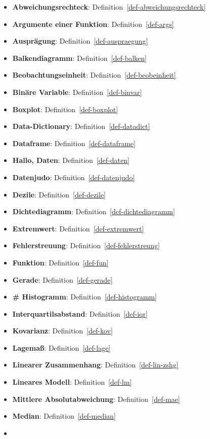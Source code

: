 \documentclass[
  a4paper,
]{scrbook}
\theoremstyle{definition}
\theoremstyle{definition}
\theoremstyle{definition}
\theoremstyle{remark}
\begin{document}
\begin{itemize}
\item
  \textbf{Abweichungsrechteck}: Definition~\ref{def-abweichungsrechteck}
\item
  \textbf{Argumente einer Funktion}: Definition~\ref{def-args}
\item
  \textbf{Ausprägung}: Definition~\ref{def-auspraegung}
\item
  \textbf{Balkendiagramm}: Definition~\ref{def-balken}
\item
  \textbf{Beobachtungseinheit}: Definition~\ref{def-beobeinheit}
\item
  \textbf{Binäre Variable}: Definition~\ref{def-binvar}
\item
  \textbf{Boxplot}: Definition~\ref{def-boxplot}
\item
  \textbf{Data-Dictionary}: Definition~\ref{def-datadict}
\item
  \textbf{Dataframe}: Definition~\ref{def-dataframe}
\item
  \textbf{Hallo, Daten}: Definition~\ref{def-daten}
\item
  \textbf{Datenjudo}: Definition~\ref{def-datenjudo}
\item
  \textbf{Dezile}: Definition~\ref{def-dezile}
\item
  \textbf{Dichtediagramm}: Definition~\ref{def-dichtediagramm}
\item
  \textbf{Extremwert}: Definition~\ref{def-extremwert}
\item
  \textbf{Fehlerstreuung}: Definition~\ref{def-fehlerstreung}
\item
  \textbf{Funktion}: Definition~\ref{def-fun}
\item
  \textbf{Gerade}: Definition~\ref{def-gerade}
\item
  \textbf{\# Histogramm}: Definition~\ref{def-histogramm}
\item
  \textbf{Interquartilsabstand}: Definition~\ref{def-iqr}
\item
  \textbf{Kovarianz}: Definition~\ref{def-kov}
\item
  \textbf{Lagemaß}: Definition~\ref{def-lage}
\item
  \textbf{Linearer Zusammenhang}: Definition~\ref{def-lin-zshg}
\item
  \textbf{Lineares Modell}: Definition~\ref{def-lm}
\item
  \textbf{Mittlere Absolutabweichung}: Definition~\ref{def-mae}
\item
  \textbf{Median}: Definition~\ref{def-median}
\item

\end{itemize}
\end{document}
